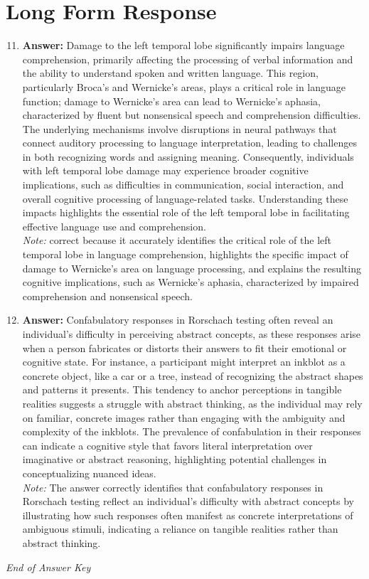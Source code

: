 \documentclass[12pt]{article}
\begin{document}
\section*{Long Form Response}
\begin{enumerate}[label=\arabic*.]
\setcounter{enumi}{10}
\item \textbf{Answer:} Damage to the left temporal lobe significantly impairs language comprehension, primarily affecting the processing of verbal information and the ability to understand spoken and written language. This region, particularly Broca's and Wernicke's areas, plays a critical role in language function; damage to Wernicke's area can lead to Wernicke's aphasia, characterized by fluent but nonsensical speech and comprehension difficulties. The underlying mechanisms involve disruptions in neural pathways that connect auditory processing to language interpretation, leading to challenges in both recognizing words and assigning meaning. Consequently, individuals with left temporal lobe damage may experience broader cognitive implications, such as difficulties in communication, social interaction, and overall cognitive processing of language-related tasks. Understanding these impacts highlights the essential role of the left temporal lobe in facilitating effective language use and comprehension.
\\ \textit{Note:} correct because it accurately identifies the critical role of the left temporal lobe in language comprehension, highlights the specific impact of damage to Wernicke's area on language processing, and explains the resulting cognitive implications, such as Wernicke's aphasia, characterized by impaired comprehension and nonsensical speech.
\item \textbf{Answer:} Confabulatory responses in Rorschach testing often reveal an individual's difficulty in perceiving abstract concepts, as these responses arise when a person fabricates or distorts their answers to fit their emotional or cognitive state. For instance, a participant might interpret an inkblot as a concrete object, like a car or a tree, instead of recognizing the abstract shapes and patterns it presents. This tendency to anchor perceptions in tangible realities suggests a struggle with abstract thinking, as the individual may rely on familiar, concrete images rather than engaging with the ambiguity and complexity of the inkblots. The prevalence of confabulation in their responses can indicate a cognitive style that favors literal interpretation over imaginative or abstract reasoning, highlighting potential challenges in conceptualizing nuanced ideas.
\\ \textit{Note:} The answer correctly identifies that confabulatory responses in Rorschach testing reflect an individual's difficulty with abstract concepts by illustrating how such responses often manifest as concrete interpretations of ambiguous stimuli, indicating a reliance on tangible realities rather than abstract thinking.
\end{enumerate}

\vfill
\noindent\textit{End of Answer Key}
\end{document}
